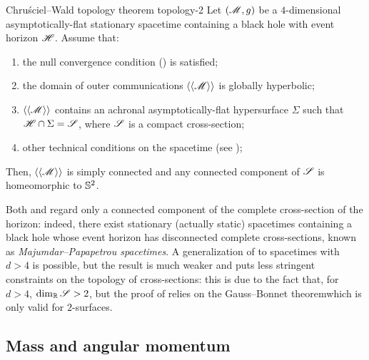 \begin{theorem}{Chruściel--Wald topology theorem \cite{chrusciel}}{topology-2}
  Let $ (\mathscr{M} , g) $ be a $ 4 $-dimensional asymptotically-flat stationary spacetime containing a black hole with event horizon $ \mathscr{H} $. Assume that:
  \begin{enumerate}
    \item \label{item:cwtt-1} the null convergence condition () is satisfied;
    \item \label{item:cwtt-2} the domain of outer communications $ \braket{\braket{\mathscr{M}}} $ is globally hyperbolic;
    \item \label{item:cwtt-3} $ \braket{\braket{\mathscr{M}}} $ contains an achronal asymptotically-flat hypersurface $ \Sigma $ such that $ \mathscr{H} \cap \Sigma = \mathscr{S} $, where $ \mathscr{S} $ is a compact cross-section;
    \item \label{item:cwtt-4} other technical conditions on the spacetime (see \cite{chrusciel});
  \end{enumerate}
  Then, $ \braket{\braket{\mathscr{M}}} $ is simply connected and any connected component of $ \mathscr{S} $ is homeomorphic to $ \mathbb{S}^{2} $.
\end{theorem}

Both  and  regard only a connected component of the complete cross-section of the horizon: indeed, there exist stationary (actually static) spacetimes containing a black hole whose event horizon has disconnected complete cross-sections, known as \emph{Majumdar--Papapetrou spacetimes}.
A generalization of  to spacetimes with $ d > 4 $ is possible, but the result is much weaker and puts less stringent constraints on the topology of cross-sections: this is due to the fact that, for $ d > 4 $, $ \dim_{\mathbb{R}} \mathscr{S} > 2 $, but the proof of  relies on the Gauss--Bonnet theorem\footnotemark which is only valid for $ 2 $-surfaces.


\subsection{Mass and angular momentum}

